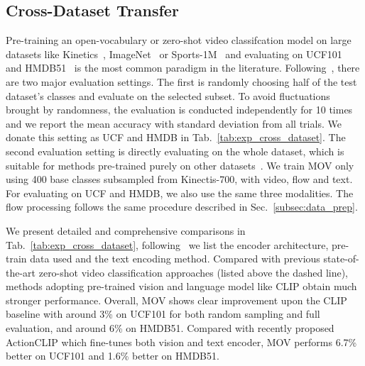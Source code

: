 \documentclass{article}
\begin{document}
\subsection{Cross-Dataset Transfer}
Pre-training an open-vocabulary or zero-shot video classifcation model on large datasets like Kinetics~\cite{carreira2019short}, ImageNet~\cite{deng2009imagenet} or Sports-1M~\cite{karpathy2014large} and evaluating on UCF101~\cite{soomro2012ucf101} and HMDB51~\cite{kuehne2011hmdb} is the most common paradigm in the literature. 
Following~\cite{brattoli2020rethinking}, there are two major evaluation settings. The first is randomly choosing half of the test dataset’s classes and evaluate on the selected subset. To avoid fluctuations brought by randomness, the evaluation is conducted independently for 10 times and we report the mean accuracy with standard deviation from all trials. 
We donate this setting as UCF and HMDB in Tab.~\ref{tab:exp_cross_dataset}. 
The second evaluation setting is directly evaluating on the whole dataset, which is suitable for methods pre-trained purely on other datasets~\cite{brattoli2020rethinking, wang2021actionclip, lin2022cross}. We train MOV only using 400 base classes subsampled from Kinectis-700, with video, flow and text. For evaluating on UCF and HMDB, we also use the same three modalities. The flow processing follows the same procedure described in Sec.~\ref{subsec:data_prep}. 

We present detailed and comprehensive comparisons in Tab.~\ref{tab:exp_cross_dataset}, following~\cite{lin2022cross} we list the encoder architecture, pre-train data used and the text encoding method.
Compared with previous state-of-the-art zero-shot video classification approaches (listed above the dashed line), methods adopting pre-trained vision and language model like CLIP obtain much stronger performance. 
Overall, MOV shows clear improvement upon the CLIP baseline with around 3\% on UCF101 for both random sampling and full evaluation, and around 6\% on HMDB51.
Compared with recently proposed ActionCLIP which fine-tunes both vision and text encoder, MOV performs 6.7\% better on UCF101 and 1.6\% better on HMDB51.
\end{document}

